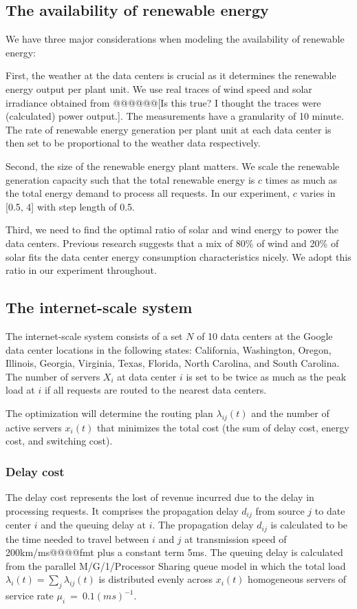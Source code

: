 \documentclass{acm_proc_article-sp}
\begin{document}
    
\subsection{The availability of renewable energy}
We have three major considerations when modeling the availability of renewable energy:  

First, the weather at the data centers is crucial as it determines the renewable energy output per plant unit. We use real traces of wind speed and solar irradiance obtained from \cite{renew1} \cite{renew2} @@@@@@[Is this true? I thought the traces were (calculated) power output.]. The measurements have a granularity of 10 minute. The rate of renewable energy generation per plant unit at each data center is then set to be proportional to the weather data respectively.

Second, the size of the renewable energy plant matters. We scale the renewable generation capacity such that the total renewable energy is $c$ times as much as the total energy demand to process all requests. In our experiment, $c$ varies in [0.5, 4] with step length of 0.5.  

Third, we need to find the optimal ratio of solar and wind energy to power the data centers. Previous research \cite{adam:GLB} suggests that a mix of 80\% of wind and 20\% of solar fits the data center energy consumption characteristics nicely. We adopt this ratio in our experiment throughout.

\subsection{The internet-scale system}
The internet-scale system consists of a set $N$ of 10 data centers at the Google data center locations in the following states: California, Washington, Oregon, Illinois, Georgia, Virginia, Texas, Florida, North Carolina, and South Carolina. The number of servers $X_i$ at data center $i$ is set to be twice as much as the peak load at $i$ if all requests are routed to the nearest data centers.

The optimization will determine the routing plan $\lambda_{ij}(t)$ and the number of active servers $x_i(t)$ that minimizes the total cost (the sum of delay cost, energy cost, and switching cost).

\subsubsection{Delay cost}
The delay cost represents the lost of revenue incurred due to the delay in processing requests. It comprises the propagation delay $d_{ij}$ from source $j$ to date center $i$ and the queuing delay at $i$.
The propagation delay $d_{ij}$ is calculated to be the time needed to travel between $i$ and $j$ at transmission speed of 200km/ms@@@@fmt plus a constant term 5ms. The queuing delay is calculated from the parallel M/G/1/Processor Sharing queue model in which the total load $\lambda_i(t)=\sum_j \lambda_{ij}(t)$ is distributed evenly across $x_i(t)$ homogeneous servers of service rate \mbox{$\mu_i$ = $0.1(ms)^{-1}$}.
\end{document}
